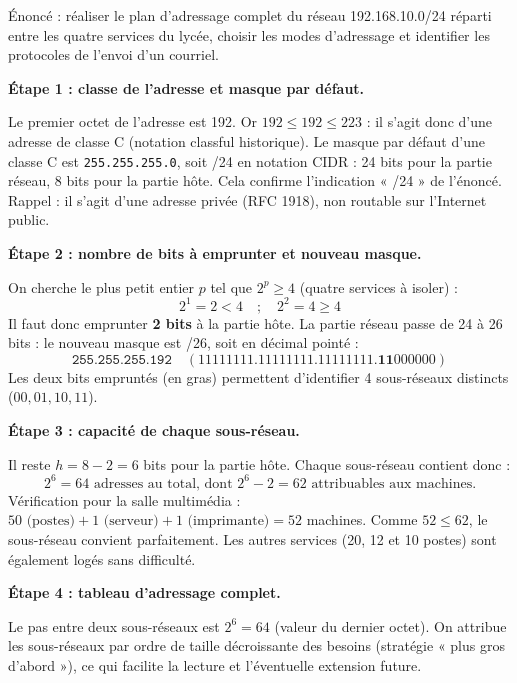 \documentclass[11pt]{article}
\newcommand{\cle}[1]{{\popxbold\color{popdark}#1}}
\begin{document}
\begin{exoresolu}
Énoncé : réaliser le plan d'adressage complet du réseau 192.168.10.0/24 réparti entre les quatre services du lycée, choisir les modes d'adressage et identifier les protocoles de l'envoi d'un courriel.

\tcblower

\textbf{Étape 1 : classe de l'adresse et masque par défaut.}

Le premier octet de l'adresse est 192. Or $192 \leq 192 \leq 223$ : il s'agit donc d'une adresse de \cle{classe C} (notation classful historique). Le masque par défaut d'une classe C est \texttt{255.255.255.0}, soit /24 en notation CIDR : 24 bits pour la partie réseau, 8 bits pour la partie hôte. Cela confirme l'indication « /24 » de l'énoncé. Rappel : il s'agit d'une adresse privée (RFC 1918), non routable sur l'Internet public.

\textbf{Étape 2 : nombre de bits à emprunter et nouveau masque.}

On cherche le plus petit entier $p$ tel que $2^p \geq 4$ (quatre services à isoler) :
\[ 2^1 = 2 < 4 \quad ; \quad 2^2 = 4 \geq 4 \]
Il faut donc emprunter \textbf{2 bits} à la partie hôte. La partie réseau passe de 24 à 26 bits : le nouveau masque est /26, soit en décimal pointé :
\[ \texttt{255.255.255.192} \quad (11111111.11111111.11111111.\mathbf{11}000000) \]
Les deux bits empruntés (en gras) permettent d'identifier 4 sous-réseaux distincts ($00, 01, 10, 11$).

\textbf{Étape 3 : capacité de chaque sous-réseau.}

Il reste $h = 8 - 2 = 6$ bits pour la partie hôte. Chaque sous-réseau contient donc :
\[ 2^6 = 64 \text{ adresses au total, dont } 2^6 - 2 = 62 \text{ attribuables aux machines.} \]
Vérification pour la salle multimédia : $50 \text{ (postes)} + 1 \text{ (serveur)} + 1 \text{ (imprimante)} = 52$ machines. Comme $52 \leq 62$, le sous-réseau convient parfaitement. Les autres services (20, 12 et 10 postes) sont également logés sans difficulté.

\textbf{Étape 4 : tableau d'adressage complet.}

Le pas entre deux sous-réseaux est $2^6 = 64$ (valeur du dernier octet). On attribue les sous-réseaux par ordre de taille décroissante des besoins (stratégie « plus gros d'abord »), ce qui facilite la lecture et l'éventuelle extension future.


\end{exoresolu}
\end{document}
